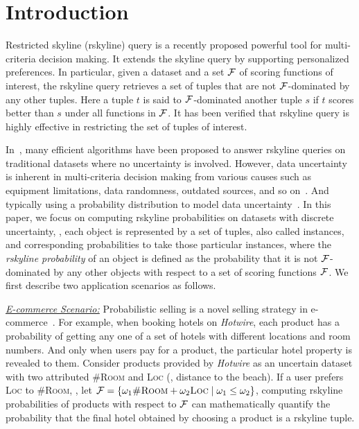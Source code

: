 \section{Introduction}

Restricted skyline (rskyline) query is a recently proposed powerful tool for multi-criteria decision making.
It extends the skyline query by supporting personalized preferences.
In particular, given a dataset and a set $\mathcal{F}$ of scoring functions of interest, the rskyline query retrieves a set of tuples that are not $\mathcal{F}$-dominated by any other tuples.
Here a tuple $t$ is said to $\mathcal{F}$-dominated another tuple $s$ if $t$ scores better than $s$ under all functions in $\mathcal{F}$.
It has been verified that rskyline query is highly effective in restricting the set of tuples of interest.

In~\cite{DBLP:journals/pvldb/CiacciaM17, DBLP:conf/icde/Liu0ZP021}, many efficient algorithms have been proposed to answer rskyline queries on traditional datasets where no uncertainty is involved.
However, data uncertainty is inherent in multi-criteria decision making from various causes such as equipment limitations, data randomness, outdated sources, and so on~\cite{DBLP:journals/fcsc/LiWLG20}.
And typically using a probability distribution to model data uncertainty~\cite{DBLP:journals/tkde/KimIP12, DBLP:conf/pods/AtallahQ09, DBLP:conf/vldb/PeiJLY07}.
In this paper, we focus on computing rskyline probabilities on datasets with discrete uncertainty, \ie, each object is represented by a set of tuples, also called instances, and corresponding probabilities to take those particular instances, where the \textit{rskyline probability} of an object is defined as the probability that it is not $\mathcal{F}$-dominated by any other objects with respect to a set of scoring functions $\mathcal{F}$.
We first describe two application scenarios as follows.

\noindent\underline{\it E-commerce Scenario:}
Probabilistic selling is a novel selling strategy in e-commerce~\cite{DBLP:journals/mktsci/FayX08}.
For example, when booking hotels on \textit{Hotwire}, each product has a probability of getting any one of a set of hotels with different locations and room numbers.
And only when users pay for a product, the particular hotel property is revealed to them.
Consider products provided by \textit{Hotwire} as an uncertain dataset with two attributed \textsc{\#Room} and \textsc{Loc} (\eg, distance to the beach).
If a user prefers \textsc{Loc} to \textsc{\#Room}, \ie, let $\mathcal{F} = \{\omega_1 \textsc{\#Room} + \omega_2 \textsc{Loc} \mid \omega_1 \le \omega_2\}$, computing rskyline probabilities of products with respect to $\mathcal{F}$ can mathematically quantify the probability that the final hotel obtained by choosing a product is a rskyline tuple.

